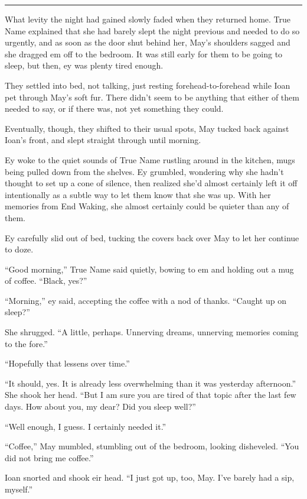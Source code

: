 \begin{center}\rule{0.5\linewidth}{0.5pt}\end{center}

What levity the night had gained slowly faded when they returned home. True Name explained that she had barely slept the night previous and needed to do so urgently, and as soon as the door shut behind her, May's shoulders sagged and she dragged em off to the bedroom. It was still early for them to be going to sleep, but then, ey was plenty tired enough.

They settled into bed, not talking, just resting forehead-to-forehead while Ioan pet through May's soft fur. There didn't seem to be anything that either of them needed to say, or if there was, not yet something they could.

Eventually, though, they shifted to their usual spots, May tucked back against Ioan's front, and slept straight through until morning.

Ey woke to the quiet sounds of True Name rustling around in the kitchen, mugs being pulled down from the shelves. Ey grumbled, wondering why she hadn't thought to set up a cone of silence, then realized she'd almost certainly left it off intentionally as a subtle way to let them know that she was up. With her memories from End Waking, she almost certainly could be quieter than any of them.

Ey carefully slid out of bed, tucking the covers back over May to let her continue to doze.

``Good morning,'' True Name said quietly, bowing to em and holding out a mug of coffee. ``Black, yes?''

``Morning,'' ey said, accepting the coffee with a nod of thanks. ``Caught up on sleep?''

She shrugged. ``A little, perhaps. Unnerving dreams, unnerving memories coming to the fore.''

``Hopefully that lessens over time.''

``It should, yes. It is already less overwhelming than it was yesterday afternoon.'' She shook her head. ``But I am sure you are tired of that topic after the last few days. How about you, my dear? Did you sleep well?''

``Well enough, I guess. I certainly needed it.''

``Coffee,'' May mumbled, stumbling out of the bedroom, looking disheveled. ``You did not bring me coffee.''

Ioan snorted and shook eir head. ``I just got up, too, May. I've barely had a sip, myself.''

